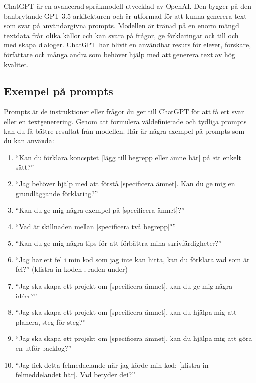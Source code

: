 ChatGPT är en avancerad språkmodell utvecklad av OpenAI. Den bygger på
den banbrytande GPT-3.5-arkitekturen och är utformad för att kunna
generera text som svar på användargivna prompts. Modellen är tränad på
en enorm mängd textdata från olika källor och kan svara på frågor, ge
förklaringar och till och med skapa dialoger. ChatGPT har blivit en
användbar resurs för elever, forskare, författare och många andra som
behöver hjälp med att generera text av hög kvalitet.

\hypertarget{exempel-puxe5-prompts}{%
\subsection{Exempel på prompts}\label{exempel-puxe5-prompts}}

Prompts är de instruktioner eller frågor du ger till ChatGPT för att få
ett svar eller en textgenerering. Genom att formulera väldefinierade och
tydliga prompts kan du få bättre resultat från modellen. Här är några
exempel på prompts som du kan använda:

\begin{enumerate}
\def\labelenumi{\arabic{enumi}.}
\tightlist
\item
  ``Kan du förklara konceptet {[}lägg till begrepp eller ämne här{]} på
  ett enkelt sätt?''
\item
  ``Jag behöver hjälp med att förstå {[}specificera ämnet{]}. Kan du ge
  mig en grundläggande förklaring?''
\item
  ``Kan du ge mig några exempel på {[}specificera ämnet{]}?''
\item
  ``Vad är skillnaden mellan {[}specificera två begrepp{]}?''
\item
  ``Kan du ge mig några tips för att förbättra mina skrivfärdigheter?''
\item
  ``Jag har ett fel i min kod som jag inte kan hitta, kan du förklara
  vad som är fel?'' (klistra in koden i raden under)
\item
  ``Jag ska skapa ett projekt om {[}specificera ämnet{]}, kan du ge mig
  några idéer?''
\item
  ``Jag ska skapa ett projekt om {[}specificera ämnet{]}, kan du hjälpa
  mig att planera, steg för steg?''
\item
  ``Jag ska skapa ett projekt om {[}specificera ämnet{]}, kan du hjälpa
  mig att göra en utför backlog?''
\item
  ``Jag fick detta felmeddelande när jag körde min kod: {[}klistra in
  felmeddelandet här{]}. Vad betyder det?''
\end{enumerate}

